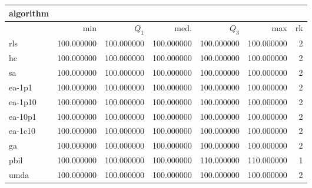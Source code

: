 \begin{tabular}{@{}l*{5}{>{{}}N{3}{0}}>{{}}N{2}{0}@{}}
\toprule
{algorithm} &  \\
\midrule
& {min} & {$Q_1$} & {med.} & {$Q_3$} & {max} & {rk}\\
\midrule
rls & {\color{blue}} 100.000000 & {\color{blue}} 100.000000 & {\color{blue}} 100.000000 & 100.000000 & 100.000000 & 2\\
hc & {\color{blue}} 100.000000 & {\color{blue}} 100.000000 & {\color{blue}} 100.000000 & 100.000000 & 100.000000 & 2\\
sa & {\color{blue}} 100.000000 & {\color{blue}} 100.000000 & {\color{blue}} 100.000000 & 100.000000 & 100.000000 & 2\\
ea-1p1 & {\color{blue}} 100.000000 & {\color{blue}} 100.000000 & {\color{blue}} 100.000000 & 100.000000 & 100.000000 & 2\\
ea-1p10 & {\color{blue}} 100.000000 & {\color{blue}} 100.000000 & {\color{blue}} 100.000000 & 100.000000 & 100.000000 & 2\\
ea-10p1 & {\color{blue}} 100.000000 & {\color{blue}} 100.000000 & {\color{blue}} 100.000000 & 100.000000 & 100.000000 & 2\\
ea-1c10 & {\color{blue}} 100.000000 & {\color{blue}} 100.000000 & {\color{blue}} 100.000000 & 100.000000 & 100.000000 & 2\\
ga & {\color{blue}} 100.000000 & {\color{blue}} 100.000000 & {\color{blue}} 100.000000 & 100.000000 & 100.000000 & 2\\
pbil & {\color{blue}} 100.000000 & {\color{blue}} 100.000000 & {\color{blue}} 100.000000 & {\color{blue}} 110.000000 & {\color{blue}} 110.000000 & 1\\
umda & {\color{blue}} 100.000000 & {\color{blue}} 100.000000 & {\color{blue}} 100.000000 & 100.000000 & 100.000000 & 2\\
\bottomrule
\end{tabular}
